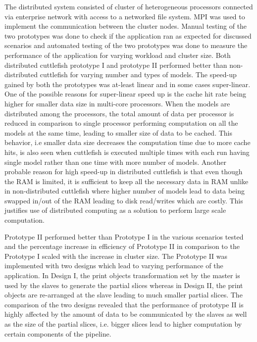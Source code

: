 The distributed system consisted of cluster of heterogeneous processors connected via enterprise network with access to a networked file system. MPI was used to implement the communication between the cluster nodes. Manual testing of the two prototypes was done to check if the application ran as expected for discussed scenarios and automated testing of the two prototypes was done to measure the performance of the application for varying workload and cluster size. Both distributed cuttlefish prototype I and prototype II performed better than non-distributed cuttlefish for varying number and types of models. The speed-up gained by both the prototypes was at-least linear and in some cases super-linear. One of the possible reasons for super-linear speed up is the cache hit rate being higher for smaller data size in multi-core processors. When the models are distributed among the processors, the total amount of data per processor is reduced in comparison to single processor performing computation on all the models at the same time, leading to smaller size of data to be cached. This behavior, i.e smaller data size decreases the computation time due to more cache hits, is also seen when cuttlefish is executed multiple times with each run having single model rather than one time with more number of models. Another probable reason for high speed-up in distributed cuttlefish is that even though the RAM is limited, it is sufficient to keep all the necessary data in RAM unlike in non-distributed cuttlefish where higher number of models lead to data being swapped in/out of the RAM leading to disk read/writes which are costly. This justifies use of distributed computing as a solution to perform large scale computation. \newline

Prototype II performed better than Prototype I in the various scenarios tested and the percentage increase in efficiency of Prototype II in comparison to the Prototype I scaled with the increase in cluster size. The Prototype II was implemented with two designs which lead to varying performance of the application. In Design I, the print objects transformation set by the master is used by the slaves to generate the partial slices whereas in Design II, the print objects are re-arranged at the slave leading to much smaller partial slices. The comparison of the two designs revealed that the performance of prototype II is highly affected by the amount of data to be communicated by the slaves as well as the size of the partial slices, i.e. bigger slices lead to higher computation by certain components of the pipeline. \newline

